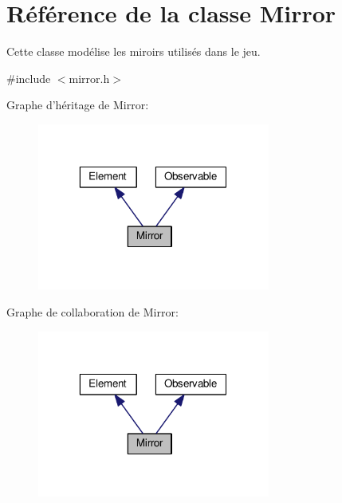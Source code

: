 \hypertarget{classMirror}{\section{Référence de la classe Mirror}
\label{classMirror}
}


Cette classe modélise les miroirs utilisés dans le jeu.  




{\ttfamily \#include $<$mirror.\+h$>$}



Graphe d'héritage de Mirror\+:
\nopagebreak
\begin{figure}[H]
\begin{center}
\leavevmode
\includegraphics[width=217pt]{d8/d7d/classMirror__inherit__graph}
\end{center}
\end{figure}


Graphe de collaboration de Mirror\+:
\nopagebreak
\begin{figure}[H]
\begin{center}
\leavevmode
\includegraphics[width=217pt]{dc/d9b/classMirror__coll__graph}
\end{center}
\end{figure}
